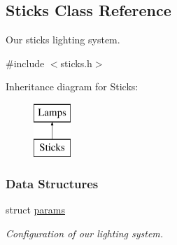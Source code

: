 \hypertarget{classSticks}{\subsection{\-Sticks \-Class \-Reference}
\label{classSticks}
}


\-Our sticks lighting system.  




{\ttfamily \#include $<$sticks.\-h$>$}

\-Inheritance diagram for \-Sticks\-:\begin{figure}[H]
\begin{center}
\leavevmode
\includegraphics[height=2.000000cm]{classSticks}
\end{center}
\end{figure}
\subsubsection*{\-Data \-Structures}
\begin{DoxyCompactItemize}
\item 
struct \hyperlink{structSticks_1_1params}{params}
\begin{DoxyCompactList}\small\item\em \-Configuration of our lighting system. \end{DoxyCompactList}\end{DoxyCompactItemize}
